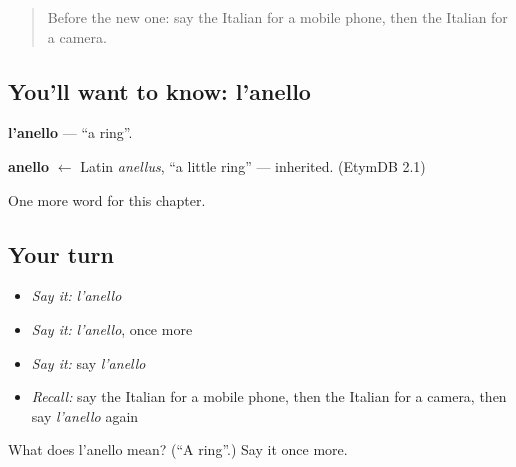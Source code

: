 \label{lesson:IT-C100-anello}



\begin{quote}
Before the new one: say the Italian for a mobile phone, then the Italian for a camera.
\end{quote}

\subsection*{You'll want to know: l'anello}
\textbf{l'anello} — \textquotedblleft{}a ring\textquotedblright{}.

\begin{cousinweb}
\textbf{anello} $\leftarrow$ Latin \emph{anellus}, \textquotedblleft{}a little ring\textquotedblright{} — inherited. (EtymDB 2.1)
\end{cousinweb}

\begin{grammarlens}[title={What you've built}]
One more word for this chapter.
\end{grammarlens}

\subsection*{Your turn}
\begin{itemize}
\raggedright
  \item \emph{Say it:} \emph{l'anello}
  \item \emph{Say it:} \emph{l'anello}, once more
  \item \emph{Say it:} say \emph{l'anello}
  \item \emph{Recall:} say the Italian for a mobile phone, then the Italian for a camera, then say \emph{l'anello} again
\end{itemize}

\begin{tcolorbox}[breakable,colback=teal!4,colframe=teal!35!black,title={Before you move on}]
What does l'anello mean? (\textquotedblleft{}A ring\textquotedblright{}.) Say it once more.
\end{tcolorbox}
